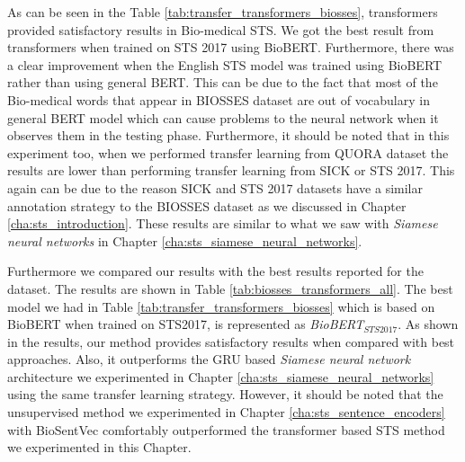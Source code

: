 As can be seen in the Table \ref{tab:transfer_transformers_biosses}, transformers provided satisfactory results in Bio-medical STS. We got the best result from transformers when trained on STS 2017 using BioBERT. Furthermore, there was a clear improvement when the English STS model was trained using BioBERT rather than using general BERT. This can be due to the fact that most of the Bio-medical words that appear in BIOSSES dataset are out of vocabulary in general BERT model which can cause problems to the neural network when it observes them in the testing phase. Furthermore, it should be noted that in this experiment too, when we performed transfer learning from QUORA dataset the results are lower than performing transfer learning from SICK or STS 2017. This again can be due to the reason SICK and STS 2017 datasets have a similar annotation strategy to the BIOSSES dataset as we discussed in Chapter \ref{cha:sts_introduction}. These results are similar to what we saw with \textit{Siamese neural networks} in Chapter \ref{cha:sts_siamese_neural_networks}.

\begin{table}[htb]
	\centering
	\caption[Results comparison for BIOSSES with top results and transformers]{Results for BIOSSES dataset with transformers compared with top results reported for BIOSSES. For each variant, Pearson Correlation ($\bm{\rho}$) is reported between the predicted values and the gold labels of the test set. }  
	\label{tab:biosses_transformers_all}
\end{table}

Furthermore we compared our results with the best results reported for the dataset. The results are shown in Table \ref{tab:biosses_transformers_all}. The best model we had in Table \ref{tab:transfer_transformers_biosses} which is based on BioBERT when trained on STS2017, is represented as \textit{BioBERT$_{STS2017}$}. As shown in the results, our method provides satisfactory results when compared with best approaches. Also, it outperforms the GRU based \textit{Siamese neural network} architecture we experimented in Chapter \ref{cha:sts_siamese_neural_networks} using the same transfer learning strategy. However, it should be noted that the unsupervised method we experimented in Chapter \ref{cha:sts_sentence_encoders} with BioSentVec \autocite{8904728} comfortably outperformed the transformer based STS method we experimented in this Chapter.

